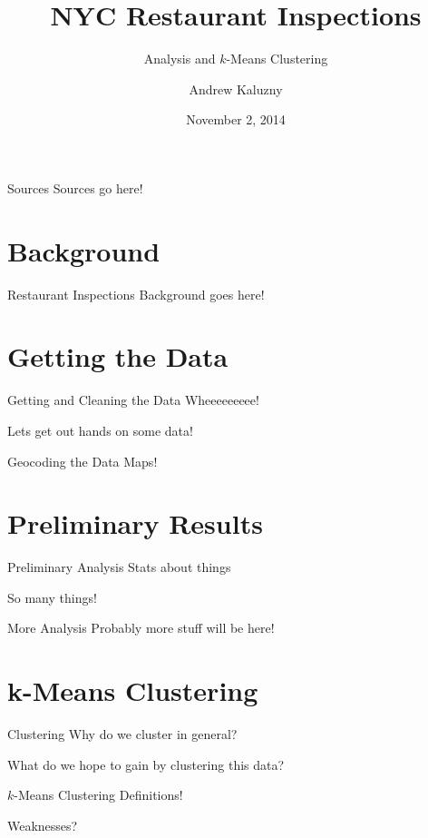 \documentclass{beamer}
\title[NYC Restaurant Inspections]{NYC Restaurant Inspections}
\subtitle{Analysis and $k$-Means Clustering}
\author{Andrew Kaluzny}
\date{November 2, 2014}
\begin{document}
\maketitle

\begin{frame}{Sources}
Sources go here!
\end{frame}

\section{Background}
\begin{frame}{Restaurant Inspections}
Background goes here!
\end{frame}

\section{Getting the Data}
\begin{frame}{Getting and Cleaning the Data}
Wheeeeeeeee!

Lets get out hands on some data!
\end{frame}

\begin{frame}{Geocoding the Data}
Maps!
\end{frame}

\section{Preliminary Results}
\begin{frame}{Preliminary Analysis}
Stats about things

So many things!
\end{frame}

\begin{frame}{More Analysis}
Probably more stuff will be here!
\end{frame}

\section{k-Means Clustering}
\begin{frame}{Clustering}
Why do we cluster in general?

What do we hope to gain by clustering this data?
\end{frame}

\begin{frame}{$k$-Means Clustering}
Definitions!

Weaknesses?
\end{frame}
\end{document}
